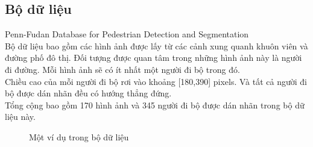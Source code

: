 \subsection{Bộ dữ liệu}
Penn-Fudan Database for Pedestrian Detection and Segmentation \cite{dataset}\\
Bộ dữ liệu bao gồm các hình ảnh được lấy từ các cảnh xung quanh khuôn viên và đường phố đô thị. Đối tượng được quan tâm trong những hình ảnh này là người đi đường. Mỗi hình ảnh sẽ có ít nhất một người đi bộ trong đó.\\
Chiều cao của mỗi người đi bộ rơi vào khoảng [180,390] pixels. Và tất cả người đi bộ được dán nhãn đều có hướng thẳng đứng.\\
Tổng cộng bao gồm 170 hình ảnh và 345 người đi bộ được dán nhãn trong bộ dữ liệu này.

\begin{figure}[h!]
    \centering
    \qquad
    \caption{Một ví dụ trong bộ dữ liệu}
    \label{fig:example}
\end{figure}